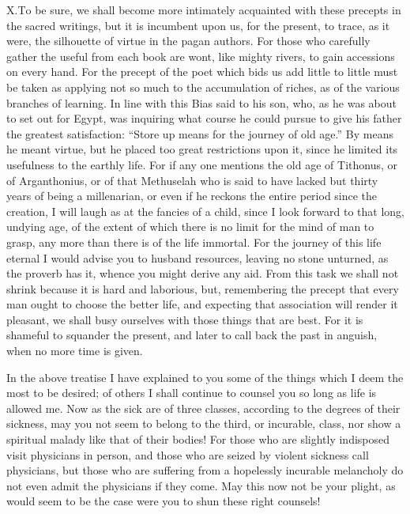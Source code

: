 \documentclass[a4paper]{article}
\begin{document}
\lettrine[lines=3, findent=3pt, nindent=0pt]{X.} To be sure, we shall become more intimately acquainted with these precepts in the sacred writings, but it is incumbent upon us, for the present, to trace, as it were, the silhouette of virtue in the pagan authors. For those who carefully gather the useful from each book are wont, like mighty rivers, to gain accessions on every hand. For the precept of the poet which bids us add little to little must be taken as applying not so much to the accumulation of riches, as of the various branches of learning. In line with this Bias said to his son, who, as he was about to set out for Egypt, was inquiring what course he could pursue to give his father the greatest satisfaction: ``Store up means for the journey of old age.'' By means he meant virtue, but he placed too great restrictions upon it, since he limited its usefulness to the earthly life. For if any one mentions the old age of Tithonus, or of Arganthonius, or of that Methuselah who is said to have lacked but thirty years of being a millenarian, or even if he reckons the entire period since the creation, I will laugh as at the fancies of a child, since I look forward to that long, undying age, of the extent of which there is no limit for the mind of man to grasp, any more than there is of the life immortal. For the journey of this life eternal I would advise you to husband resources, leaving no stone unturned, as the proverb has it, whence you might derive any aid. From this task we shall not shrink because it is hard and laborious, but, remembering the precept that every man ought to choose the better life, and expecting that association will render it pleasant, we shall busy ourselves with those things that are best. For it is shameful to squander the present, and later to call back the past in anguish, when no more time is given. 

\bigskip

In the above treatise I have explained to you some of the things which I deem the most to be desired; of others I shall continue to counsel you so long as life is allowed me. Now as the sick are of three classes, according to the degrees of their sickness, may you not seem to belong to the third, or incurable, class, nor show a spiritual malady like that of their bodies! For those who are slightly indisposed visit physicians in person, and those who are seized by violent sickness call physicians, but those who are suffering from a hopelessly incurable melancholy do not even admit the physicians if they come. May this now not be your plight, as would seem to be the case were you to shun these right counsels!  
\end{document}
